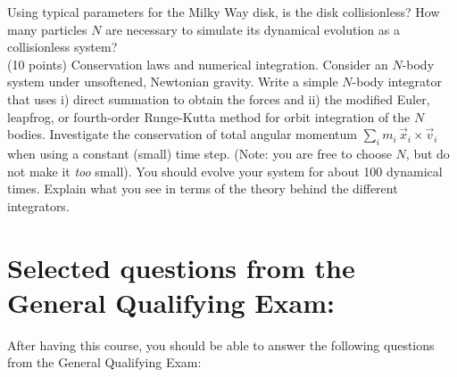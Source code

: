 \documentclass[12pt]{article}
\begin{document}
 Using typical parameters for the Milky Way disk, is
the disk collisionless? How many particles $N$ are necessary to
simulate its dynamical evolution as a collisionless system?\\

 (10 points) Conservation laws and numerical
integration. Consider an $N$-body system under unsoftened, Newtonian
gravity. Write a simple $N$-body integrator that uses i) direct
summation to obtain the forces and ii) the modified Euler, leapfrog,
or fourth-order Runge-Kutta method for orbit integration of the $N$
bodies. Investigate the conservation of total angular momentum $\sum_i
m_i\,\vec{x}_i\times\vec{v}_i$ when using a constant (small) time
step. (Note: you are free to choose $N$, but do not make it \emph{too}
small). You should evolve your system for about 100 dynamical
times. Explain what you see in terms of the theory behind the
different integrators.

\newpage

\section*{Selected questions from the General Qualifying Exam:}

After having this course, you should be able to answer the following
questions from the General Qualifying Exam:
\end{document}
